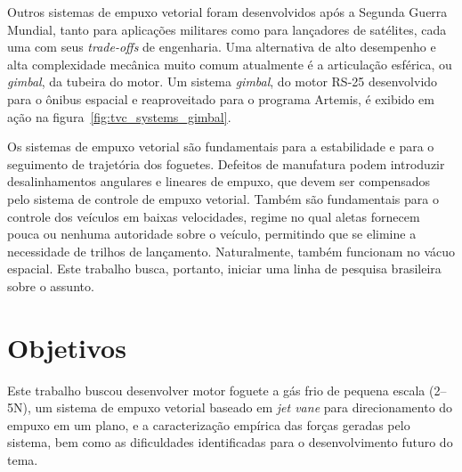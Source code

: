 Outros sistemas de empuxo vetorial foram desenvolvidos após a Segunda Guerra Mundial, tanto para aplicações militares como para lançadores de satélites, cada uma com seus \textit{trade-offs} de engenharia. Uma alternativa de alto desempenho e alta complexidade mecânica muito comum atualmente é a articulação esférica, ou \textit{gimbal}, da tubeira do motor. Um sistema \textit{gimbal}, do motor RS-25 desenvolvido para o ônibus espacial e reaproveitado para o programa Artemis, é exibido em ação na figura~\ref{fig:tvc_systems_gimbal}.

Os sistemas de empuxo vetorial são fundamentais para a estabilidade e para o seguimento de trajetória dos foguetes. Defeitos de manufatura podem introduzir desalinhamentos angulares e lineares de empuxo, que devem ser compensados pelo sistema de controle de empuxo vetorial. Também são fundamentais para o controle dos veículos em baixas velocidades, regime no qual aletas fornecem pouca ou nenhuma autoridade sobre o veículo, permitindo que se elimine a necessidade de trilhos de lançamento. Naturalmente, também funcionam no vácuo espacial. Este trabalho busca, portanto, iniciar uma linha de pesquisa brasileira sobre o assunto.

\section{Objetivos}

Este trabalho buscou desenvolver motor foguete a gás frio de pequena escala (2--5N), um sistema de empuxo vetorial baseado em \textit{jet vane} para direcionamento do empuxo em um plano, e a caracterização empírica das forças geradas pelo sistema, bem como as dificuldades identificadas para o desenvolvimento futuro do tema.